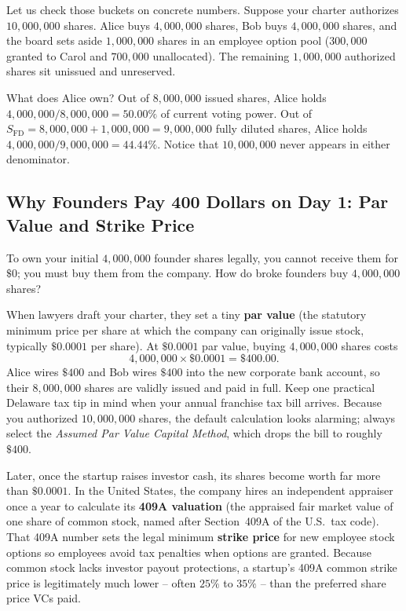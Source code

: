 Let us check those buckets on concrete numbers. Suppose your charter authorizes $10{,}000{,}000$ shares. Alice buys $4{,}000{,}000$ shares, Bob buys $4{,}000{,}000$ shares, and the board sets aside $1{,}000{,}000$ shares in an employee option pool ($300{,}000$ granted to Carol and $700{,}000$ unallocated). The remaining $1{,}000{,}000$ authorized shares sit unissued and unreserved.

What does Alice own? Out of $8{,}000{,}000$ issued shares, Alice holds $4{,}000{,}000 / 8{,}000{,}000 = 50.00\%$ of current voting power. Out of $S_{\text{FD}} = 8{,}000{,}000 + 1{,}000{,}000 = 9{,}000{,}000$ fully diluted shares, Alice holds $4{,}000{,}000 / 9{,}000{,}000 = 44.44\%$. Notice that $10{,}000{,}000$ never appears in either denominator.

\subsection{Why Founders Pay 400 Dollars on Day 1: Par Value and Strike Price}

To own your initial $4{,}000{,}000$ founder shares legally, you cannot receive them for $\$0$; you must buy them from the company. How do broke founders buy $4{,}000{,}000$ shares?

When lawyers draft your charter, they set a tiny \textbf{par value} (the statutory minimum price per share at which the company can originally issue stock, typically $\$0.0001$ per share). At $\$0.0001$ par value, buying $4{,}000{,}000$ shares costs
\[
  4{,}000{,}000 \times \$0.0001 = \$400.00.
\]
Alice wires $\$400$ and Bob wires $\$400$ into the new corporate bank account, so their $8{,}000{,}000$ shares are validly issued and paid in full. Keep one practical Delaware tax tip in mind when your annual franchise tax bill arrives. Because you authorized $10{,}000{,}000$ shares, the default calculation looks alarming; always select the \emph{Assumed Par Value Capital Method}, which drops the bill to roughly $\$400$.

Later, once the startup raises investor cash, its shares become worth far more than $\$0.0001$. In the United States, the company hires an independent appraiser once a year to calculate its \textbf{409A valuation} (the appraised fair market value of one share of common stock, named after Section~409A of the U.S.\ tax code). That 409A number sets the legal minimum \textbf{strike price} for new employee stock options so employees avoid tax penalties when options are granted. Because common stock lacks investor payout protections, a startup's 409A common strike price is legitimately much lower -- often $25\%$ to $35\%$ -- than the preferred share price VCs paid.

